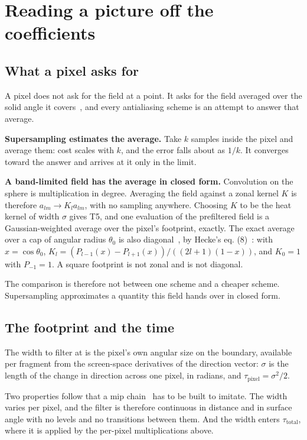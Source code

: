 \section{Reading a picture off the coefficients}

\subsection{What a pixel asks for}

A pixel does not ask for the field at a point. It asks for the field averaged over the solid angle it covers~\cite{src:Ramamoorthi-and-Hanrahan-2001}, and every antialiasing scheme is an attempt to answer that average.

\textbf{Supersampling estimates the average.} Take \(k\) samples inside the pixel and average them: cost scales with \(k\), and the error falls about as \(1/k\). It converges toward the answer and arrives at it only in the limit.

\textbf{A band-limited field has the average in closed form.} Convolution on the sphere is multiplication in degree. Averaging the field against a zonal kernel \(K\) is therefore \(a_{lm} \to K_l a_{lm}\), with no sampling anywhere. Choosing \(K\) to be the heat kernel of width \(\sigma\) gives T5, and one evaluation of the prefiltered field is a Gaussian-weighted average over the pixel's footprint, exactly. The exact average over a cap of angular radius \(\theta_0\) is also diagonal~\cite[Part~1]{src:Funk-1915}, by Hecke's eq. (8)~\cite[Section~3]{src:Hecke-1917}: with \(x = \cos\theta_0\), \(K_l = (P_{l-1}(x) - P_{l+1}(x)) / ((2l+1)(1-x))\), and \(K_0 = 1\) with \(P_{-1} = 1\). A square footprint is not zonal and is not diagonal.

The comparison is therefore not between one scheme and a cheaper scheme. Supersampling approximates a quantity this field hands over in closed form.

\subsection{The footprint and the time}

The width to filter at is the pixel's own angular size on the boundary, available per fragment from the screen-space derivatives of the direction vector: \(\sigma\) is the length of the change in direction across one pixel, in radians, and \(\tau_{\text{pixel}} = \sigma^2/2\).

Two properties follow that a mip chain~\cite{src:Williams-1983} has to be built to imitate. The width varies per pixel, and the filter is therefore continuous in distance and in surface angle with no levels and no transitions between them. And the width enters \(\tau_{\text{total}}\), where it is applied by the per-pixel multiplications above.

